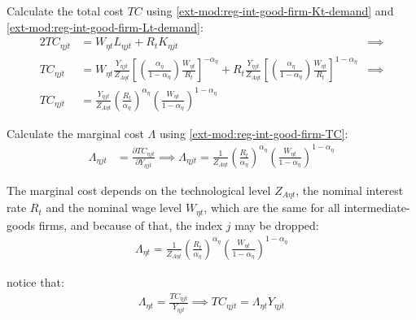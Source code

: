 \documentclass[../thesis.tex]{subfiles}
\begin{document}
Calculate the total cost $TC$ using \ref{ext-mod:reg-int-good-firm-Kt-demand} and \ref{ext-mod:reg-int-good-firm-Lt-demand}:
\begin{alignat}{2}
	TC_{\eta jt} & = W_{\eta t} L_{\eta jt} + R_{t} K_{\eta jt} &\implies \nonumber \\
	TC_{\eta jt} & = W_{\eta t} \frac{Y_{\eta jt}}{Z_{A\eta t}} \left[ \left( \frac{{\alpha_{\eta}}}{1-\alpha_{\eta}} \right) \frac{W_{\eta t}}{R_{t}} \right]^{-{\alpha_{\eta}}} + R_{t} \frac{Y_{\eta jt}}{Z_{A\eta t}} \left[ \left( \frac{{\alpha_{\eta}}}{1-\alpha_{\eta}} \right) \frac{W_{\eta t}}{R_{t}} \right]^{1-\alpha_{\eta}} &\implies \nonumber \\
	TC_{\eta jt} & = \frac{Y_{\eta jt}}{Z_{A\eta t}} \left( \frac{R_{t}}{{\alpha_{\eta}}} \right)^{{\alpha_{\eta}}} \left( \frac{W_{\eta t}}{1-\alpha_{\eta}} \right)^{1-\alpha_{\eta}} \label{ext-mod:reg-int-good-firm-TC}
\end{alignat}


Calculate the marginal cost $\Lambda$ using \ref{ext-mod:reg-int-good-firm-TC}: 
\begin{align}
	\Lambda_{\eta jt} & = \frac{\partial TC_{\eta jt}}{\partial Y_{\eta jt}} \implies 
	\Lambda_{\eta jt} = \frac{1}{Z_{A\eta t}} \left( \frac{R_{t}}{{\alpha_{\eta}}} \right)^{{\alpha_{\eta}}} \left( \frac{W_{\eta t}}{1-\alpha_{\eta}} \right)^{1-\alpha_{\eta}} \label{ext-mod:reg-int-good-firm-MC}
\end{align}

The marginal cost depends on the technological level $Z_{A\eta t}$, the nominal interest rate $R_{t}$ and the nominal wage level $W_{\eta t}$, which are the same for all intermediate-goods firms, and because of that, the index $j$ may be dropped:
\begin{align}
	\Lambda_{\eta t} = \frac{1}{Z_{A\eta t}} \left( \frac{R_{t}}{{\alpha_{\eta}}} \right)^{{\alpha_{\eta}}} \left( \frac{W_{\eta t}}{1-\alpha_{\eta}} \right)^{1-\alpha_{\eta}} \label{ext-mod:reg-int-good-firm-MC-2}
\end{align}

notice that:
\begin{align}
	\Lambda_{\eta t} = \frac{TC_{\eta jt}}{Y_{\eta jt}} \implies 
	TC_{\eta jt} = \Lambda_{\eta t} Y_{\eta jt} \label{ext-mod:reg-int-good-firm-TC-MC}
\end{align}
\end{document}
